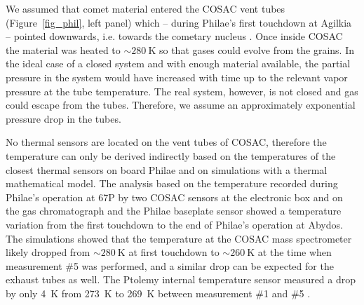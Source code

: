 \documentclass{aa}
\begin{document}
We assumed that   
comet material entered the COSAC vent tubes (Figure~\ref{fig_phil}, left panel) which -- during Philae's first touchdown at Agilkia -- 
pointed downwards, i.e. towards the cometary nucleus \citep{goesmann2015}.  Once inside COSAC the 
material was heated to $\mathrm{\sim 280~K}$  so that
gases  could evolve from the grains. In the ideal case of a closed system and with enough material available, the partial pressure in the system would have increased with time up to the relevant vapor pressure at the tube temperature.
The real system, however, is not closed and gas could escape from the tubes. Therefore,  we assume an 
approximately exponential pressure drop in the tubes.

No thermal sensors are located on the vent tubes of COSAC, therefore the temperature can only be 
derived indirectly based on the temperatures of the closest thermal sensors on board Philae and on 
simulations with a thermal mathematical model. The analysis based on 
the temperature recorded during Philae's operation 
at 67P by two COSAC sensors  at the electronic box and on the gas chromatograph and the Philae baseplate sensor  showed a temperature variation from the first touchdown to the end of Philae's operation at Abydos.  The simulations showed that
the temperature at the COSAC mass spectrometer likely dropped from $\mathrm{\sim 280~K}$ at first touchdown 
to $\mathrm{\sim 260~K}$ \citep{cozzoni2016} at the time when measurement \#5 was performed, and a similar drop can be expected for the exhaust tubes as 
well. The Ptolemy internal temperature sensor measured a drop by only 4~K from 
273~K to 269~K between measurement \#1 and \#5 \citep[][their Tab.~1]{morse2015}.
\end{document}
